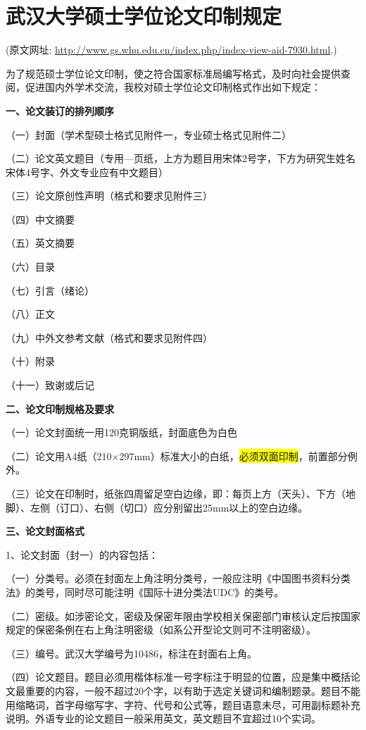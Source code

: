 \documentclass{WHUMaster}   %
\begin{document}
\chapter{武汉大学硕士学位论文印制规定}

(原文网址: \url{http://www.gs.whu.edu.cn/index.php/index-view-aid-7930.html}.)

为了规范硕士学位论文印制，使之符合国家标准局编写格式，及时向社会提供查阅，促进国内外学术交流，我校对硕士学位论文印制格式作出如下规定：

\textbf{一、论文装订的排列顺序}

（一）封面（学术型硕士格式见附件一，专业硕士格式见附件二）

（二）论文英文题目（专用—页纸，上方为题目用宋体2号字，下方为研究生姓名宋体4号字、外文专业应有中文题目）

（三）论文原创性声明（格式和要求见附件三）

（四）中文摘要

（五）英文摘要

（六）目录

（七）引言（绪论）

（八）正文

（九）中外文参考文献（格式和要求见附件四）

（十）附录

（十一）致谢或后记

\textbf{二、论文印制规格及要求}

（一）论文封面统一用120克铜版纸，封面底色为白色

（二）论文用A4纸（210×297mm）标准大小的白纸，\colorbox{yellow}{必须双面印制}，前置部分例外。

（三）论文在印制时，纸张四周留足空白边缘，即：每页上方（天头）、下方（地脚）、左侧（订口）、右侧（切口）应分别留出25mm以上的空白边缘。

\textbf{三、论文封面格式}

1、论文封面（封一）的内容包括：

（一）分类号。必须在封面左上角注明分类号，一般应注明《中国图书资料分类法》的类号，同时尽可能注明《国际十进分类法UDC》的类号。

（二）密级。如涉密论文，密级及保密年限由学校相关保密部门审核认定后按国家规定的保密条例在右上角注明密级（如系公开型论文则可不注明密级）。

（三）编号。武汉大学编号为10486，标注在封面右上角。

（四）论文题目。题目必须用楷体标准一号字标注于明显的位置，应是集中概括论文最重要的内容，一般不超过20个字，以有助于选定关键词和编制题录。题目不能用缩略词，首字母缩写字、字符、代号和公式等，题目语意未尽，可用副标题补充说明。外语专业的论文题目一般采用英文，英文题目不宜超过10个实词。
\end{document}
